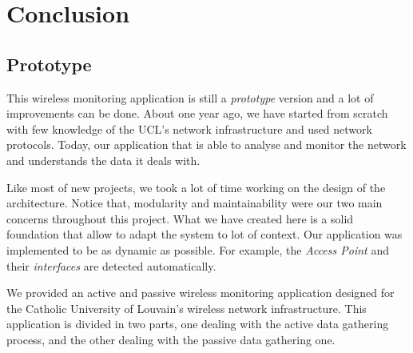 
\chapter{Conclusion} %

\label{Chapter 7} %


\section{Prototype}
This wireless monitoring application is still a \emph{prototype} version and a lot of improvements can be done. About one year ago, we have started from scratch with few knowledge of the UCL's network infrastructure and used network protocols. Today, our application that is able to analyse and monitor the network and understands the data it deals with. 

Like most of new projects, we took a lot of time working on the design of the architecture. Notice that, modularity and maintainability were our two main concerns throughout this project. What we have created here is a solid foundation that allow to adapt the system to lot of context. Our application was implemented to be as dynamic as possible. For example, the \emph{Access Point} and their \emph{interfaces} are detected automatically.


We provided an active and passive wireless monitoring application designed for the Catholic University of Louvain's wireless network infrastructure. This application is divided in two parts, one dealing with the active data gathering process, and the other dealing with the passive data gathering one. 




